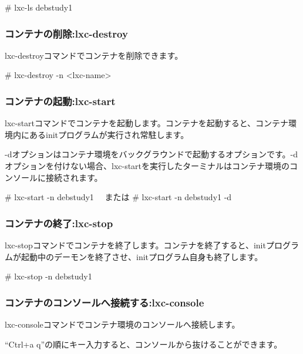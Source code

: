 \documentclass[mingoth,a4paper]{jsarticle}
\begin{document}
\begin{commandline}
  # lxc-ls
  debstudy1
\end{commandline}


\subsubsection{コンテナの削除:lxc-destroy}

lxc-destroyコマンドでコンテナを削除できます。

\begin{commandline}
  # lxc-destroy -n <lxc-name>
\end{commandline}


\subsubsection{コンテナの起動:lxc-start}

lxc-startコマンドでコンテナを起動します。コンテナを起動すると、コンテナ環境内にあるinitプログラムが実行され常駐します。

-dオプションはコンテナ環境をバックグラウンドで起動するオプションです。-dオプションを付けない場合、lxc-startを実行したターミナルはコンテナ環境のコンソールに接続されます。

\begin{commandline}
  # lxc-start -n debstudy1
  　または
  # lxc-start -n debstudy1 -d
\end{commandline}


\subsubsection{コンテナの終了:lxc-stop}

lxc-stopコマンドでコンテナを終了します。コンテナを終了すると、initプログラムが起動中のデーモンを終了させ、initプログラム自身も終了します。

\begin{commandline}
  # lxc-stop -n debstudy1
\end{commandline}

\subsubsection{コンテナのコンソールへ接続する:lxc-console}

lxc-consoleコマンドでコンテナ環境のコンソールへ接続します。

``Ctrl+a q''の順にキー入力すると、コンソールから抜けることができます。
\end{document}
